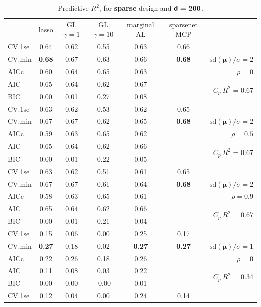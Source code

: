 \documentclass[12pt]{article}
\newcommand{\mr}[1]{\mathrm{#1}}
\newcommand{\bm}[1]{\mathbf{#1}}
\begin{document}
\begin{table}[p]\vspace{-.5cm}
\caption[l]{ Predictive $R^2$, for {\bf sparse} design and  $\boldsymbol{{\sf d}=200}$.}
\vspace{-.5cm}
\small{}
\begin{center}
\begin{tabular}{l*{5}{c}|r}
 & lasso & GL $\gamma=1$ & GL $\gamma=10$ & marginal AL & sparsenet MCP  &  \\
CV.1se & 0.64 & 0.62 & 0.55 & 0.63 & 0.66 &\\
CV.min & {\bf 0.68} & 0.67 & 0.63 & 0.66 & {\bf 0.68} &  $\mr{sd}(\bm{\mu})/\sigma=2$ \\
AICc & 0.60 & 0.64 & 0.65 & 0.63 & & $\rho=0$ \\
AIC & 0.65 & 0.64 & 0.62 & 0.67 & & \multirow{2}{*}{$C_p ~ R^2$ = 0.67} \\
BIC & 0.00 & 0.01 & 0.27 & 0.08 & & \\
 \hline 
CV.1se & 0.63 & 0.62 & 0.53 & 0.62 & 0.65 &\\
CV.min & 0.67 & 0.67 & 0.62 & 0.65 & {\bf 0.68} &  $\mr{sd}(\bm{\mu})/\sigma=2$ \\
AICc & 0.59 & 0.63 & 0.65 & 0.62 & & $\rho=0.5$ \\
AIC & 0.65 & 0.64 & 0.62 & 0.66 & & \multirow{2}{*}{$C_p ~ R^2$ = 0.67} \\
BIC & 0.00 & 0.01 & 0.22 & 0.05 & & \\
 \hline 
CV.1se & 0.63 & 0.62 & 0.51 & 0.61 & 0.65 &\\
CV.min & 0.67 & 0.67 & 0.61 & 0.64 & {\bf 0.68} &  $\mr{sd}(\bm{\mu})/\sigma=2$ \\
AICc & 0.58 & 0.63 & 0.65 & 0.61 & & $\rho=0.9$ \\
AIC & 0.65 & 0.64 & 0.62 & 0.66 & & \multirow{2}{*}{$C_p ~ R^2$ = 0.67} \\
BIC & 0.00 & 0.01 & 0.21 & 0.04 & & \\
 \hline 
CV.1se & 0.15 & 0.06 & 0.00 & 0.25 & 0.17 &\\
CV.min & {\bf 0.27} & 0.18 & 0.02 & {\bf 0.27} & {\bf 0.27} &  $\mr{sd}(\bm{\mu})/\sigma=1$ \\
AICc & 0.22 & 0.26 & 0.18 & 0.26 & & $\rho=0$ \\
AIC & 0.11 & 0.08 & 0.03 & 0.22 & & \multirow{2}{*}{$C_p ~ R^2$ = 0.34} \\
BIC & 0.00 & 0.00 & -0.00 & 0.01 & & \\
 \hline 
CV.1se & 0.12 & 0.04 & 0.00 & 0.24 & 0.14 &\\

\end{tabular}
\end{center}
\end{table}
\end{document}
